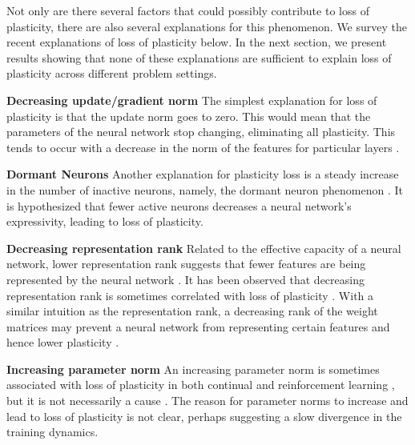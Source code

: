 \documentclass{article}
\begin{document}
Not only are there several factors that could possibly contribute to loss of plasticity, there are also several explanations for this phenomenon. We survey the recent explanations of loss of plasticity below. In the next section, we present results showing that none of these explanations are sufficient to explain loss of plasticity across different problem settings.

  \textbf{Decreasing update/gradient norm}\hspace{2mm} The simplest explanation for loss of plasticity is that the update norm goes to zero. This would mean that the parameters of the neural network stop changing, eliminating all plasticity. This tends to occur with a decrease in the norm of the features for particular layers \citep{abbas23_loss_plast_contin_deep_reinf_learn,nikishin22_primac_bias_deep_reinf_learn}.

  \textbf{Dormant Neurons}\hspace{2mm} Another explanation for plasticity loss is a steady increase in the number of inactive neurons, namely, the dormant neuron phenomenon \citep{sokar23_dorman_neuron_phenom_deep_reinf_learn}.
  It is hypothesized that fewer active neurons decreases a neural network's expressivity, leading to loss of plasticity.

   \textbf{Decreasing representation rank}\hspace{2mm} Related to the effective capacity of a neural network, lower representation rank suggests that fewer features are being represented by the neural network \citep{kumar20_implic_under_param_inhib_data}.
  It has been observed that decreasing representation rank is sometimes correlated with loss of plasticity \citep{lyle23_under,kumar23_maint_plast_regen_regul,dohare23_maint_plast_deep_contin_learn}.
  With a similar intuition as the representation rank, a decreasing rank of the weight matrices may prevent a neural network from representing certain features and hence lower plasticity \citep{lyle23_under, gulcehre22_rl}.

  \textbf{Increasing parameter norm}\hspace{2mm} An increasing parameter norm is sometimes associated with loss of plasticity in both continual and reinforcement learning \citep{nikishin22_primac_bias_deep_reinf_learn,dohare23_maint_plast_deep_contin_learn}, but it is not necessarily a cause \citep{lyle23_under}. The reason for parameter norms to increase and lead to loss of plasticity is not clear, perhaps suggesting a slow divergence in the training dynamics.
\end{document}
